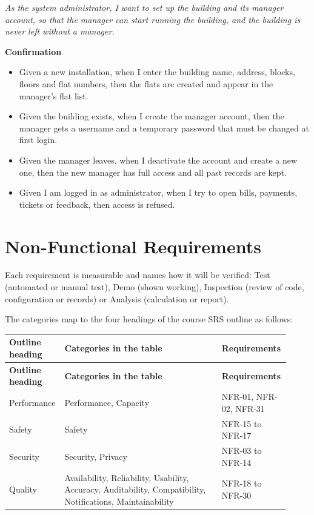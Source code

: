 \documentclass[11pt,a4paper]{report}
\begin{document}
\emph{As the system administrator, I want to set up the building and its manager account, so that the manager can start running the building, and the building is never left without a manager.}

\medskip\noindent\textbf{Confirmation}\par

\begin{itemize}
  \item Given a new installation, when I enter the building name, address, blocks, floors and flat numbers, then the flats are created and appear in the manager's flat list.
  \item Given the building exists, when I create the manager account, then the manager gets a username and a temporary password that must be changed at first login.
  \item Given the manager leaves, when I deactivate the account and create a new one, then the new manager has full access and all past records are kept.
  \item Given I am logged in as administrator, when I try to open bills, payments, tickets or feedback, then access is refused.
\end{itemize}

\section{Non-Functional Requirements}

Each requirement is measurable and names how it will be verified: Test (automated or manual test), Demo (shown working), Inspection (review of code, configuration or records) or Analysis (calculation or report).

The categories map to the four headings of the course SRS outline as follows:

{\setlength{\LTpre}{6pt}\setlength{\LTpost}{6pt}
\begin{longtable}{>{\raggedright\arraybackslash}p{0.149\linewidth}>{\raggedright\arraybackslash}p{0.551\linewidth}>{\raggedright\arraybackslash}p{0.225\linewidth}}
\toprule
\textbf{Outline heading} & \textbf{Categories in the table} & \textbf{Requirements} \\
\midrule
\endfirsthead
\toprule
\textbf{Outline heading} & \textbf{Categories in the table} & \textbf{Requirements} \\
\midrule
\endhead
\bottomrule
\endlastfoot
Performance & Performance, Capacity & NFR-01, NFR-02, NFR-31 \\
Safety & Safety & NFR-15 to NFR-17 \\
Security & Security, Privacy & NFR-03 to NFR-14 \\
Quality & Availability, Reliability, Usability, Accuracy, Auditability, Compatibility, Notifications, Maintainability & NFR-18 to NFR-30 \\
\end{longtable}
}
\end{document}
